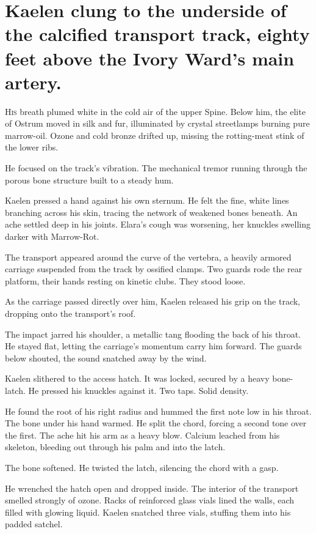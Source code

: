 \chapter{Kaelen clung to the underside of the calcified transport track, eighty feet above the Ivory Ward's main artery.}

\lettrine[lines=2, lhang=0.1, nindent=0.2em]{H}{is} breath plumed white in the cold air of the upper Spine. Below him, the elite of Ostrum moved in silk and fur, illuminated by crystal streetlamps burning pure marrow-oil. Ozone and cold bronze drifted up, missing the rotting-meat stink of the lower ribs.


He focused on the track's vibration. The mechanical tremor running through the porous bone structure built to a steady hum.

Kaelen pressed a hand against his own sternum. He felt the fine, white lines branching across his skin, tracing the network of weakened bones beneath. An ache settled deep in his joints. Elara's cough was worsening, her knuckles swelling darker with Marrow-Rot.

The transport appeared around the curve of the vertebra, a heavily armored carriage suspended from the track by ossified clamps. Two guards rode the rear platform, their hands resting on kinetic clubs. They stood loose.

As the carriage passed directly over him, Kaelen released his grip on the track, dropping onto the transport's roof.

The impact jarred his shoulder, a metallic tang flooding the back of his throat. He stayed flat, letting the carriage's momentum carry him forward. The guards below shouted, the sound snatched away by the wind.

Kaelen slithered to the access hatch. It was locked, secured by a heavy bone-latch. He pressed his knuckles against it. Two taps. Solid density.

He found the root of his right radius and hummed the first note low in his throat. The bone under his hand warmed. He split the chord, forcing a second tone over the first. The ache hit his arm as a heavy blow. Calcium leached from his skeleton, bleeding out through his palm and into the latch.

The bone softened. He twisted the latch, silencing the chord with a gasp.

He wrenched the hatch open and dropped inside. The interior of the transport smelled strongly of ozone. Racks of reinforced glass vials lined the walls, each filled with glowing liquid. Kaelen snatched three vials, stuffing them into his padded satchel.

